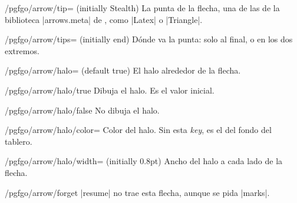 \begin{key}{/pgfgo/arrow/tip= (initially Stealth)}
	La punta de la flecha, una de las de la biblioteca |arrows.meta| de \tikzname, como |Latex| o |Triangle|.
\end{key}

\begin{key}{/pgfgo/arrow/tips= (initially end)}
	Dónde va la punta: solo al final, o en los dos extremos.

	\begin{codeexample}[]
		\begin{goban}[5]
		\end{goban}
	\end{codeexample}
\end{key}

\begin{key}{/pgfgo/arrow/halo= (default true)}
	El halo alrededor de la flecha.
\end{key}

\begin{stylekey}{/pgfgo/arrow/halo/true}
	Dibuja el halo. Es el valor inicial.
\end{stylekey}

\begin{stylekey}{/pgfgo/arrow/halo/false}
	No dibuja el halo.
\end{stylekey}

\begin{key}{/pgfgo/arrow/halo/color=}
	Color del halo. Sin esta \emph{key}, es el del fondo del tablero.
\end{key}

\begin{key}{/pgfgo/arrow/halo/width= (initially 0.8pt)}
	Ancho del halo a cada lado de la flecha.

	\begin{codeexample}[]
		\begin{goban}[5]
		\end{goban}
	\end{codeexample}
\end{key}

\begin{key}{/pgfgo/arrow/forget}
	|resume| no trae esta flecha, aunque se pida |marks|.
\end{key}

